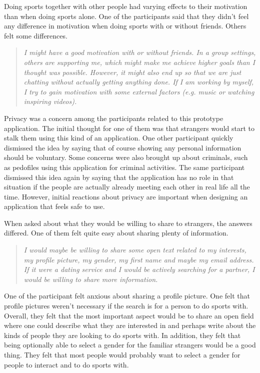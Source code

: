 Doing sports together with other people had varying effects to their motivation than when doing sports alone. One of the participants said that they didn't feel any difference in motivation when doing sports with or without friends. Others felt some differences.

\begin{quotation}
\it I might have a good motivation with or without friends. In a group settings, others are supporting me, which might make me achieve higher goals than I thought was possible. However, it might also end up so that we are just chatting without actually getting anything done. If I am working by myself, I try to gain motivation with some external factors (e.g. music or watching inspiring videos).
\end{quotation}

Privacy was a concern among the participants related to this prototype application. The initial thought for one of them was that strangers would start to stalk them using this kind of an application. One other participant quickly dismissed the idea by saying that of course showing any personal information should be voluntary. Some concerns were also brought up about criminals, such as pedofiles using this application for criminal activities. The same participant dismissed this idea again by saying that the application has no role in that situation if the people are actually already meeting each other in real life all the time. However, initial reactions about privacy are important when designing an application that feels safe to use.

When asked about what they would be willing to share to strangers, the answers differed. One of them felt quite easy about sharing plenty of information.

\begin{quotation}
\it I would maybe be willing to share some open text related to my interests, my profile picture, my gender, my first name and maybe my email address. If it were a dating service and I would be actively searching for a partner, I would be willing to share more information.
\end{quotation}

One of the participant felt anxious about sharing a profile picture. One felt that profile pictures weren't necessary if the search is for a person to do sports with. Overall, they felt that the most important aspect would be to share an open field where one could describe what they are interested in and perhaps write about the kinds of people they are looking to do sports with. In addition, they felt that being optionally able to select a gender for the familiar strangers would be a good thing. They felt that most people would probably want to select a gender for people to interact and to do sports with.

